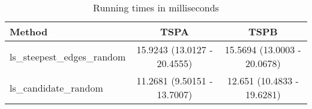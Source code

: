 \begin{table}[!htbp]
\centering
\caption{Running times in milliseconds}
\begin{tabular}{lcc}
\hline
 Method & TSPA & TSPB \\
\hline
ls\_steepest\_edges\_random & 15.9243 (13.0127 - 20.4555) & 15.5694 (13.0003 - 20.0678) \\
ls\_candidate\_random & 11.2681 (9.50151 - 13.7007) & 12.651 (10.4833 - 19.6281) \\
\hline
\end{tabular}
\end{table}